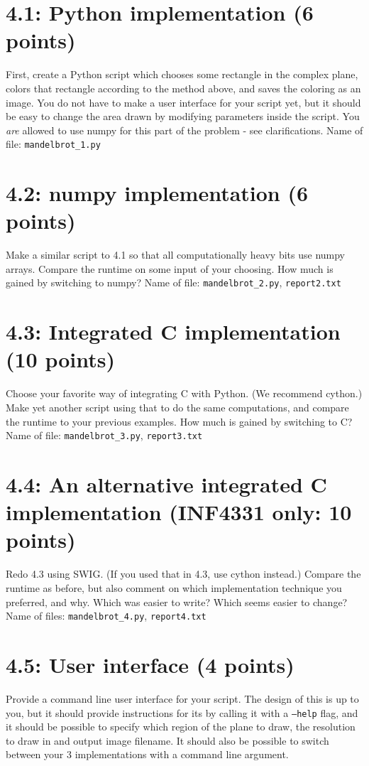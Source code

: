 \documentclass[english]{article}
\begin{document}
\section{4.1: Python implementation (6 points)}
First, create a Python script which chooses some rectangle in the complex plane, colors that rectangle according to the method above, and saves the coloring as an image. You do not have to make a user interface for your script yet, but it should be easy to change the area drawn by modifying parameters inside the script.   \newline
You \emph{are} allowed to use numpy for this part of the problem - see clarifications.
\newline
Name of file: \texttt{mandelbrot\_1.py}
\section{4.2: numpy implementation (6 points)}
Make a similar script to 4.1 so that all computationally heavy bits use numpy arrays. Compare the runtime on some input of your choosing. How much is gained by switching to numpy?
\newline
Name of file: \texttt{mandelbrot\_2.py}, \texttt{report2.txt}
\section{4.3: Integrated C implementation (10 points)}
Choose your favorite way of integrating C with Python. (We recommend cython.) Make yet another script using that to do the same computations, and compare the runtime to your previous examples. How much is gained by switching to C?
\newline
Name of file: \texttt{mandelbrot\_3.py}, \texttt{report3.txt}
\section{4.4: An alternative integrated C implementation (INF4331 only: 10 points)}
Redo 4.3 using SWIG. (If you used that in 4.3, use cython instead.) Compare the runtime as before, but also comment on which implementation technique you preferred, and why. Which was easier to write? Which seems easier to change?
\newline
Name of files: \texttt{mandelbrot\_4.py}, \texttt{report4.txt}


\section{4.5: User interface (4 points)}
Provide a command line user interface for your script. The design of this is up to you, but it should provide instructions for its by calling it with a \texttt{--help} flag, and it should be possible to specify which region of the plane to draw, the resolution to draw in and output image filename. It should also be possible to switch between your 3 implementations with a command line argument.
\end{document}
